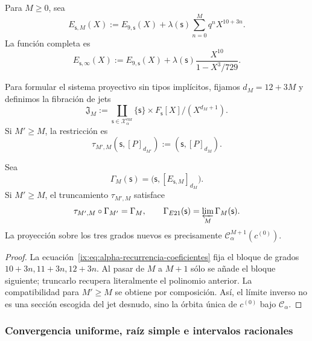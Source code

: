 Para \(M\geq0\), sea
\begin{equation}
 E_{\mathsf s,M}(X):=E_{9,\mathsf s}(X)
 +\lambda(\mathsf s)\sum_{n=0}^{M}q^nX^{10+3n}.
 \label{ix:eq:alpha-truncamientos-completos}
\end{equation}
La función completa es
\begin{equation}
 E_{\mathsf s,\infty}(X)
 :=E_{9,\mathsf s}(X)
 +\lambda(\mathsf s)\frac{X^{10}}{1-X^3/729}.
 \label{ix:eq:alpha-funcion-completa-explicita}
\end{equation}

Para formular el sistema proyectivo sin tipos implícitos, fijamos
\(d_M=12+3M\) y definimos la fibración de jets
\begin{equation}
 \mathfrak J_M:=
 \coprod_{\mathsf s\in\mathcal X_\alpha^{\mathrm{enr}}}
 \{\mathsf s\}\times F_{\mathsf s}[X]/(X^{d_M+1}).
 \label{ix:eq:alpha-espacio-jets-rev08}
\end{equation}
Si \(M'\ge M\), la restricción es
\begin{equation}
 \tau_{M',M}(\mathsf s,[P]_{d_{M'}})
 :=(\mathsf s,[P]_{d_M}).
 \label{ix:eq:alpha-truncamiento-jets-rev08}
\end{equation}

\begin{proposition}
\label{ix:prop:alpha-naturalidad-recurrencia-explicita}
Sea
\[
 \Gamma_M(\mathsf s)
 =\bigl(\mathsf s,[E_{\mathsf s,M}]_{d_M}\bigr).
\]
Si \(M'\geq M\), el truncamiento \(\tau_{M',M}\) satisface
\begin{equation}
 \tau_{M',M}\circ\Gamma_{M'}=\Gamma_M,
 \qquad
 \Gamma_{E21}(\mathsf s)=\varprojlim_M\Gamma_M(\mathsf s).
 \label{ix:eq:alpha-naturalidad-explicita}
\end{equation}
La proyección sobre los tres grados nuevos es precisamente
\(\mathcal C_\alpha^{M+1}(c^{(0)})\).
\end{proposition}

\begin{proof}
La ecuación~\eqref{ix:eq:alpha-recurrencia-coeficientes} fija el bloque de
grados \(10+3n,11+3n,12+3n\). Al pasar de \(M\) a \(M+1\) sólo se añade
el bloque siguiente; truncarlo recupera literalmente el polinomio anterior.
La compatibilidad para \(M'\geq M\) se obtiene por composición. Así, el
límite inverso no es una sección escogida del jet desnudo, sino la órbita
única de \(c^{(0)}\) bajo \(\mathcal C_\alpha\).
\end{proof}

\subsubsection{Convergencia uniforme, raíz simple e intervalos racionales}
\label{ix:subsec:alpha-cotas-completas-rev08}

